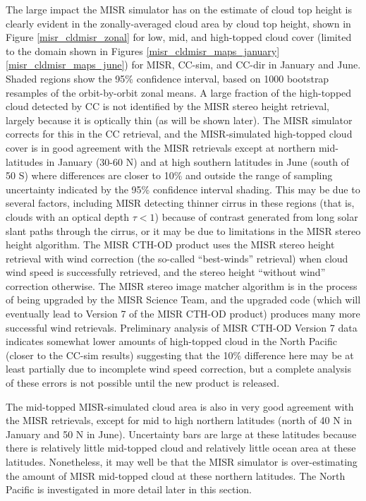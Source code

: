 The large impact the MISR simulator has on the estimate of cloud top height is clearly evident in the zonally-averaged cloud area by cloud top height, shown in Figure \ref{misr_cldmisr_zonal} for low, mid, and high-topped cloud cover (limited to the domain shown in Figures \ref{misr_cldmisr_maps_january} \ref{misr_cldmisr_maps_june}) for MISR, CC-sim, and CC-dir in January and June. Shaded regions show the 95\% confidence interval, based on 1000 bootstrap resamples of the orbit-by-orbit zonal means. A large fraction of the high-topped cloud detected by CC is not identified by the MISR stereo height retrieval, largely because it is optically thin (as will be shown later). The MISR simulator corrects for this in the CC retrieval, and the MISR-simulated high-topped cloud cover is in good agreement with the MISR retrievals except at northern mid-latitudes in January (30-60 N) and at high southern latitudes in June (south of 50 S) where differences are closer to 10\% and outside the range of sampling uncertainty indicated by the 95\% confidence interval shading. This may be due to several factors, including MISR detecting thinner cirrus in these regions (that is, clouds with an optical depth $\tau < 1$) because of contrast generated from long solar slant paths through the cirrus, or it may be due to limitations in the MISR stereo height algorithm. The MISR CTH-OD product uses the MISR stereo height retrieval with wind correction (the so-called ``best-winds'' retrieval) when cloud wind speed is successfully retrieved, and the stereo height ``without wind'' correction otherwise. The MISR stereo image matcher algorithm is in the process of being upgraded by the MISR Science Team, and the upgraded code (which will eventually lead to Version 7 of the MISR CTH-OD product) produces many more successful wind retrievals. Preliminary analysis of MISR CTH-OD Version 7 data indicates somewhat lower amounts of high-topped cloud in the North Pacific (closer to the CC-sim results) suggesting that the 10\% difference here may be at least partially due to incomplete wind speed correction, but a complete analysis of these errors is not possible until the new product is released.

The mid-topped MISR-simulated cloud area is also in very good agreement with the MISR retrievals, except for mid to high northern latitudes (north of 40 N in January and 50 N in June). Uncertainty bars are large at these latitudes because there is relatively little mid-topped cloud and relatively little ocean area at these latitudes. Nonetheless, it may well be that the MISR simulator is over-estimating the amount of MISR mid-topped cloud at these northern latitudes. The North Pacific is investigated in more detail later in this section.

